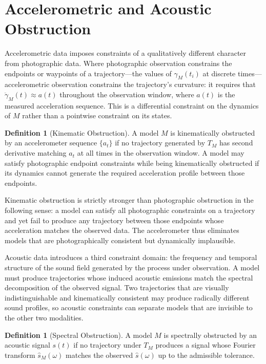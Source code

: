 \documentclass[12pt, a4paper, oneside]{article}
\theoremstyle{plain}
\theoremstyle{definition}
\newtheorem{definition}[theorem]{Definition}
\theoremstyle{remark}
\newcommand{\T}{T}
\begin{document}
\section{Accelerometric and Acoustic Obstruction}

Accelerometric data imposes constraints of a qualitatively different character from photographic data. Where photographic observation constrains the endpoints or waypoints of a trajectory---the values of $\gamma_M(t_i)$ at discrete times---accelerometric observation constrains the trajectory's curvature: it requires that $\ddot{\gamma}_M(t) \approx a(t)$ throughout the observation window, where $a(t)$ is the measured acceleration sequence. This is a differential constraint on the dynamics of $M$ rather than a pointwise constraint on its states.

\begin{definition}[Kinematic Obstruction]
A model $M$ is kinematically obstructed by an accelerometer sequence $\{a_t\}$ if no trajectory generated by $\T_M$ has second derivative matching $a_t$ at all times in the observation window. A model may satisfy photographic endpoint constraints while being kinematically obstructed if its dynamics cannot generate the required acceleration profile between those endpoints.
\end{definition}

Kinematic obstruction is strictly stronger than photographic obstruction in the following sense: a model can satisfy all photographic constraints on a trajectory and yet fail to produce any trajectory between those endpoints whose acceleration matches the observed data. The accelerometer thus eliminates models that are photographically consistent but dynamically implausible.

Acoustic data introduces a third constraint domain: the frequency and temporal structure of the sound field generated by the process under observation. A model must produce trajectories whose induced acoustic emissions match the spectral decomposition of the observed signal. Two trajectories that are visually indistinguishable and kinematically consistent may produce radically different sound profiles, so acoustic constraints can separate models that are invisible to the other two modalities.

\begin{definition}[Spectral Obstruction]
A model $M$ is spectrally obstructed by an acoustic signal $s(t)$ if no trajectory under $\T_M$ produces a signal whose Fourier transform $\hat{s}_M(\omega)$ matches the observed $\hat{s}(\omega)$ up to the admissible tolerance.
\end{definition}
\end{document}
